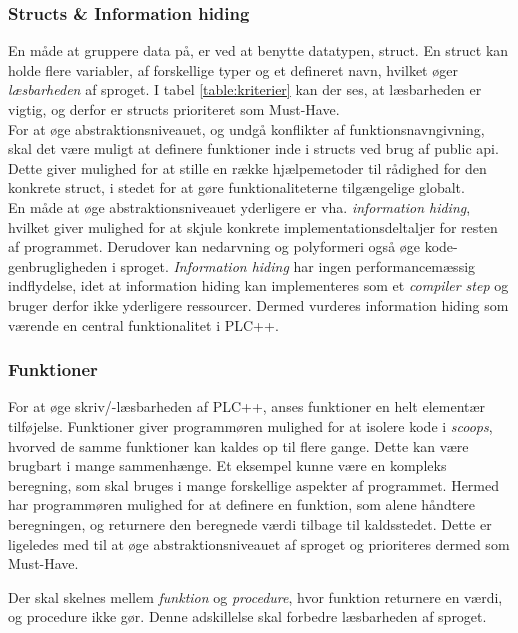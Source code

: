 \subsubsection{Structs \& Information hiding} 
En måde at gruppere data på, er ved at benytte datatypen, struct. En struct kan holde flere variabler, af forskellige typer og et defineret navn, hvilket øger \textit{læsbarheden} af sproget. I tabel \ref{table:kriterier} kan der ses, at læsbarheden er vigtig, og derfor er structs prioriteret som Must-Have. \\

\noindent For at øge abstraktionsniveauet, og undgå konflikter af funktionsnavngivning, skal det være muligt at definere funktioner inde i structs ved brug af public \gls{api}. Dette giver mulighed for at stille en række hjælpemetoder til rådighed for den konkrete struct, i stedet for at gøre funktionaliteterne tilgængelige globalt.\\ 

\noindent En måde at øge abstraktionsniveauet yderligere er vha. \textit{information hiding}, hvilket giver mulighed for at skjule konkrete implementationsdeltaljer for resten af programmet. Derudover kan nedarvning og polyformeri også øge kode-genbrugligheden i sproget. \textit{Information hiding} har ingen performancemæssig indflydelse, idet at information hiding kan implementeres som et \textit{compiler step} og bruger derfor ikke yderligere ressourcer. Dermed vurderes information hiding som værende en central funktionalitet i PLC++.

\subsubsection{Funktioner}
For at øge skriv/-læsbarheden af PLC++, anses funktioner en helt elementær tilføjelse. Funktioner giver programmøren mulighed for at isolere kode i \textit{scoops}, hvorved de samme funktioner kan kaldes op til flere gange. Dette kan være brugbart i mange sammenhænge. Et eksempel kunne være en kompleks beregning, som skal bruges i mange forskellige aspekter af programmet. Hermed har programmøren mulighed for at definere en funktion, som alene håndtere beregningen, og returnere den beregnede værdi tilbage til kaldsstedet. Dette er ligeledes med til at øge abstraktionsniveauet af sproget og prioriteres dermed som Must-Have.

Der skal skelnes mellem \textit{funktion} og \textit{procedure}, hvor funktion returnere en værdi, og procedure ikke gør. Denne adskillelse skal forbedre læsbarheden af sproget. 


